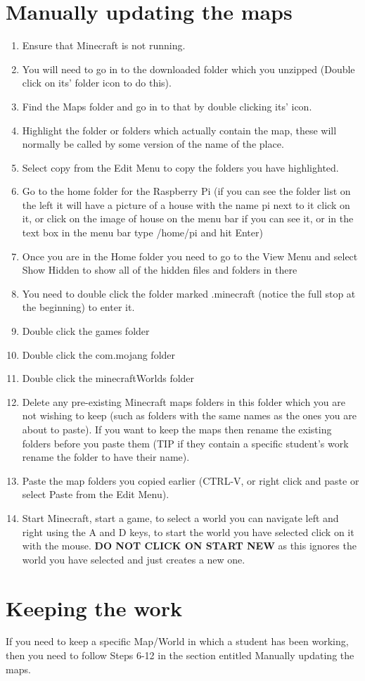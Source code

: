 \documentclass{geocraft-worksheet-multipage}
\begin{document}
\section*{Manually updating the maps}
\begin{enumerate}
\item Ensure that Minecraft is not running.
\item You will need to go in to the downloaded folder which you unzipped
(Double click on its' folder icon to do this).
\item Find the Maps folder and go in to that by double clicking its'
  icon.
\item Highlight the folder or folders which actually contain the map, these will
  normally be called by some version of the name of the place. 
\item Select copy from the Edit Menu to copy the folders you have
  highlighted.
\item Go to the home folder for the Raspberry Pi (if you can see the
  folder list on the left it will have a picture of a house with the
  name pi next to it click on it, or click on the image of house on
  the menu bar if you can see it, or in the text box in the menu bar
  type /home/pi and hit Enter)
\item Once you are in the Home folder you need to go to the View Menu
  and select Show Hidden to show all of the hidden files and folders
  in there
\item You need to double click the folder marked .minecraft (notice
  the full stop at the beginning) to enter it.
\item Double click the games folder
\item Double click the com.mojang folder
\item Double click the minecraftWorlds folder
\item Delete any pre-existing Minecraft maps folders in this folder
  which you are not wishing to keep (such as folders with the same
  names as the ones you are about to paste). If you want to keep the
  maps then rename the existing folders before you paste them (TIP if they
  contain a specific student's work rename the folder to have their
  name). 
\item Paste the map folders you copied earlier (CTRL-V, or right click
  and paste or select Paste from the Edit Menu).
\item Start Minecraft, start a game, to select a world you can
  navigate left and right using the A and D keys, to start the world
  you have selected click on it with the mouse. \textbf{DO NOT CLICK
    ON START NEW} as this ignores the world you have selected and just
  creates a new one.
\end{enumerate}

\section*{Keeping the work}
If you need to keep a specific Map/World in which a student has been
working, then you need to follow Steps 6-12 in the section entitled
Manually updating the maps.
\end{document}
